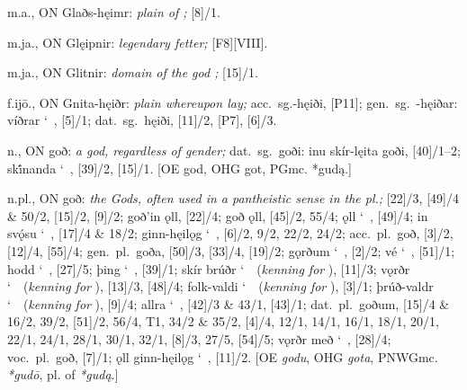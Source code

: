 \begin{itemize}
 m.a., ON Glaðs-hęimr:
  \emph{plain of ;} [8]/1.

 m.ja., ON Glęipnir:
  \emph{legendary fetter;} [F8][VIII].

 m.ja., ON Glitnir:
  \emph{domain of the god ;} [15]/1.

 f.ijō., ON Gnita-hęiðr:
  \emph{plain whereupon  lay;} acc.~sg.-hęiði, [P11]; gen.~sg.~-hęiðar: víðrar \char`~, [5]/1; dat.~sg.~hęiði, [11]/2, [P7], [6]/3.

 n., ON goð:
  \emph{a god, regardless of gender;} dat.~sg.~goði: inu skír-lęita goði, [40]/1--2; ski̇́nanda \char`~, [39]/2, [15]/1.
  [OE god, OHG got, PGmc. *gudą.]

 n.pl., ON goð:
  \emph{the Gods, often used in a pantheistic sense in the pl.;}
  [22]/3, [49]/4 \& 50/2, [15]/2, [9]/2;
  goð’in ǫll, [22]/4;
  goð ǫll, [45]/2, 55/4;
  ǫll \char`~, [49]/4;
  in svǫ́su \char`~, [17]/4 \& 18/2;
  ginn-hęilǫg \char`~, [6]/2, 9/2, 22/2, 24/2;
  acc.~pl.~goð, [3]/2, [12]/4, [55]/4;
  gen.~pl.~goða, [50]/3, [33]/4, [19]/2; gǫrðum \char`~, [2]/2; vé \char`~, [51]/1; hodd \char`~, [27]/5; þing \char`~, [39]/1;
  skír brúðr \char`~\ (\emph{kenning for }), [11]/3; vǫrðr \char`~\ (\emph{kenning for }), [13]/3, [48]/4; folk-valdi \char`~\ (\emph{kenning for }), [3]/1;
  þrúð-valdr \char`~\ (\emph{kenning for }), [9]/4; allra \char`~, [42]/3 \& 43/1, [43]/1;
  dat.~pl.~goðum, [15]/4 \& 16/2, 39/2, [51]/2, 56/4,  T1, 34/2 \& 35/2, [4]/4, 12/1, 14/1, 16/1, 18/1, 20/1, 22/1, 24/1, 28/1, 30/1, 32/1, [8]/3, 27/5, [54]/5; vǫrðr með \char`~, [28]/4;
  voc.~pl.~goð, [7]/1; ǫll ginn-hęilǫg \char`~, [11]/2.
  [OE \emph{godu}, OHG \emph{gota}, PNWGmc. \emph{*gudō}, pl. of \emph{*gudą}.]


\end{itemize}
